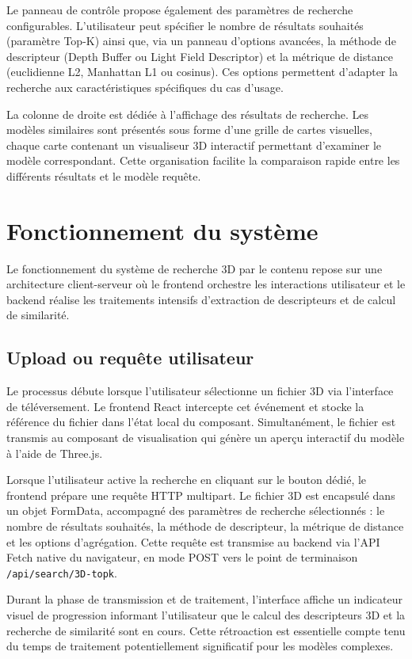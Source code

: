 \documentclass[11pt,a4paper,oneside]{report}
\begin{document}
Le panneau de contrôle propose également des paramètres de recherche configurables. L'utilisateur peut spécifier le nombre de résultats souhaités (paramètre Top-K) ainsi que, via un panneau d'options avancées, la méthode de descripteur (Depth Buffer ou Light Field Descriptor) et la métrique de distance (euclidienne L2, Manhattan L1 ou cosinus). Ces options permettent d'adapter la recherche aux caractéristiques spécifiques du cas d'usage.

La colonne de droite est dédiée à l'affichage des résultats de recherche. Les modèles similaires sont présentés sous forme d'une grille de cartes visuelles, chaque carte contenant un visualiseur 3D interactif permettant d'examiner le modèle correspondant. Cette organisation facilite la comparaison rapide entre les différents résultats et le modèle requête.

\section{Fonctionnement du système}

Le fonctionnement du système de recherche 3D par le contenu repose sur une architecture client-serveur où le frontend orchestre les interactions utilisateur et le backend réalise les traitements intensifs d'extraction de descripteurs et de calcul de similarité.

\subsection{Upload ou requête utilisateur}

Le processus débute lorsque l'utilisateur sélectionne un fichier 3D via l'interface de téléversement. Le frontend React intercepte cet événement et stocke la référence du fichier dans l'état local du composant. Simultanément, le fichier est transmis au composant de visualisation qui génère un aperçu interactif du modèle à l'aide de Three.js.

Lorsque l'utilisateur active la recherche en cliquant sur le bouton dédié, le frontend prépare une requête HTTP multipart. Le fichier 3D est encapsulé dans un objet FormData, accompagné des paramètres de recherche sélectionnés : le nombre de résultats souhaités, la méthode de descripteur, la métrique de distance et les options d'agrégation. Cette requête est transmise au backend via l'API Fetch native du navigateur, en mode POST vers le point de terminaison \texttt{/api/search/3D-topk}.

Durant la phase de transmission et de traitement, l'interface affiche un indicateur visuel de progression informant l'utilisateur que le calcul des descripteurs 3D et la recherche de similarité sont en cours. Cette rétroaction est essentielle compte tenu du temps de traitement potentiellement significatif pour les modèles complexes.
\end{document}
